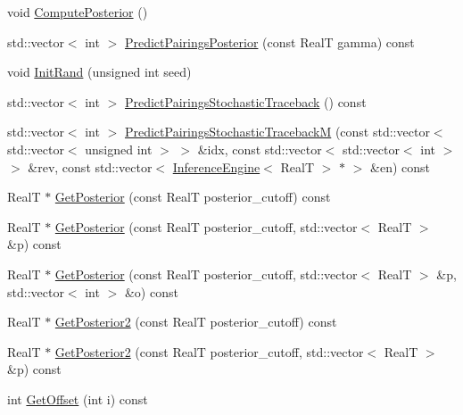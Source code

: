 \begin{DoxyCompactItemize}
void \hyperlink{class_inference_engine_aef03cd26f3758cfff297703bb37b5e9f}{Compute\+Posterior} ()
\item 
std\+::vector$<$ int $>$ \hyperlink{class_inference_engine_a11dda913fd2fd805a5262b662f53903f}{Predict\+Pairings\+Posterior} (const Real\+T gamma) const 
\item 
void \hyperlink{class_inference_engine_a1d4f39be3bdae1bc9e10e2e6c5c92958}{Init\+Rand} (unsigned int seed)
\item 
std\+::vector$<$ int $>$ \hyperlink{class_inference_engine_a0dd5cd1e780cf45b9f8cbe425f8cd924}{Predict\+Pairings\+Stochastic\+Traceback} () const 
\item 
std\+::vector$<$ int $>$ \hyperlink{class_inference_engine_aeb97e13498894ed68d38ab298bb8cbc9}{Predict\+Pairings\+Stochastic\+Traceback\+M} (const std\+::vector$<$ std\+::vector$<$ unsigned int $>$ $>$ \&idx, const std\+::vector$<$ std\+::vector$<$ int $>$ $>$ \&rev, const std\+::vector$<$ \hyperlink{class_inference_engine}{Inference\+Engine}$<$ Real\+T $>$ $\ast$ $>$ \&en) const 
\item 
Real\+T $\ast$ \hyperlink{class_inference_engine_ac554dcc770a4a700726ca26ae499b2da}{Get\+Posterior} (const Real\+T posterior\+\_\+cutoff) const 
\item 
Real\+T $\ast$ \hyperlink{class_inference_engine_acd84174fb4e866c3d83cdc43484ac6c8}{Get\+Posterior} (const Real\+T posterior\+\_\+cutoff, std\+::vector$<$ Real\+T $>$ \&p) const 
\item 
Real\+T $\ast$ \hyperlink{class_inference_engine_abdc92a839529f9075eb8220ab00e5152}{Get\+Posterior} (const Real\+T posterior\+\_\+cutoff, std\+::vector$<$ Real\+T $>$ \&p, std\+::vector$<$ int $>$ \&o) const 
\item 
Real\+T $\ast$ \hyperlink{class_inference_engine_a6d8d2be0e035900e7d9ee0f68eedfb06}{Get\+Posterior2} (const Real\+T posterior\+\_\+cutoff) const 
\item 
Real\+T $\ast$ \hyperlink{class_inference_engine_a09efab11b1a1e44813785ed23cda914e}{Get\+Posterior2} (const Real\+T posterior\+\_\+cutoff, std\+::vector$<$ Real\+T $>$ \&p) const 
\item 
int \hyperlink{class_inference_engine_ab696518de694f07a25b5c5af4ba66312}{Get\+Offset} (int i) const 
\end{DoxyCompactItemize}


